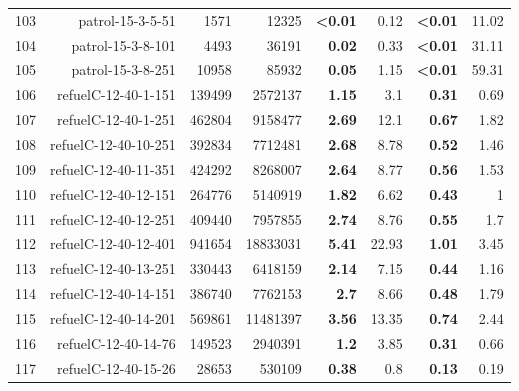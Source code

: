 \begin{longtable}{lrr@{\hskip 12pt}r@{\hskip 12pt}r@{\hskip 12pt}r@{\hskip 12pt}r@{\hskip 12pt}r}
103 & \multirow{1}{*}{patrol-15-3-5-51} & \multirow{1}{*}{1571} & \multirow{1}{*}{12325} & \textbf{<0.01} & 0.12 & \textbf{<0.01} & 11.02 \\
104 & \multirow{1}{*}{patrol-15-3-8-101} & \multirow{1}{*}{4493} & \multirow{1}{*}{36191} & \textbf{0.02} & 0.33 & \textbf{<0.01} & 31.11 \\
105 & \multirow{1}{*}{patrol-15-3-8-251} & \multirow{1}{*}{10958} & \multirow{1}{*}{85932} & \textbf{0.05} & 1.15 & \textbf{<0.01} & 59.31 \\
106 & \multirow{1}{*}{refuelC-12-40-1-151} & \multirow{1}{*}{139499} & \multirow{1}{*}{2572137} & \textbf{1.15} & 3.1 & \textbf{0.31} & 0.69 \\
107 & \multirow{1}{*}{refuelC-12-40-1-251} & \multirow{1}{*}{462804} & \multirow{1}{*}{9158477} & \textbf{2.69} & 12.1 & \textbf{0.67} & 1.82 \\
108 & \multirow{1}{*}{refuelC-12-40-10-251} & \multirow{1}{*}{392834} & \multirow{1}{*}{7712481} & \textbf{2.68} & 8.78 & \textbf{0.52} & 1.46 \\
109 & \multirow{1}{*}{refuelC-12-40-11-351} & \multirow{1}{*}{424292} & \multirow{1}{*}{8268007} & \textbf{2.64} & 8.77 & \textbf{0.56} & 1.53 \\
110 & \multirow{1}{*}{refuelC-12-40-12-151} & \multirow{1}{*}{264776} & \multirow{1}{*}{5140919} & \textbf{1.82} & 6.62 & \textbf{0.43} & 1 \\
111 & \multirow{1}{*}{refuelC-12-40-12-251} & \multirow{1}{*}{409440} & \multirow{1}{*}{7957855} & \textbf{2.74} & 8.76 & \textbf{0.55} & 1.7 \\
112 & \multirow{1}{*}{refuelC-12-40-12-401} & \multirow{1}{*}{941654} & \multirow{1}{*}{18833031} & \textbf{5.41} & 22.93 & \textbf{1.01} & 3.45 \\
113 & \multirow{1}{*}{refuelC-12-40-13-251} & \multirow{1}{*}{330443} & \multirow{1}{*}{6418159} & \textbf{2.14} & 7.15 & \textbf{0.44} & 1.16 \\
114 & \multirow{1}{*}{refuelC-12-40-14-151} & \multirow{1}{*}{386740} & \multirow{1}{*}{7762153} & \textbf{2.7} & 8.66 & \textbf{0.48} & 1.79 \\
115 & \multirow{1}{*}{refuelC-12-40-14-201} & \multirow{1}{*}{569861} & \multirow{1}{*}{11481397} & \textbf{3.56} & 13.35 & \textbf{0.74} & 2.44 \\
116 & \multirow{1}{*}{refuelC-12-40-14-76} & \multirow{1}{*}{149523} & \multirow{1}{*}{2940391} & \textbf{1.2} & 3.85 & \textbf{0.31} & 0.66 \\
117 & \multirow{1}{*}{refuelC-12-40-15-26} & \multirow{1}{*}{28653} & \multirow{1}{*}{530109} & \textbf{0.38} & 0.8 & \textbf{0.13} & 0.19 \\

\end{longtable}
